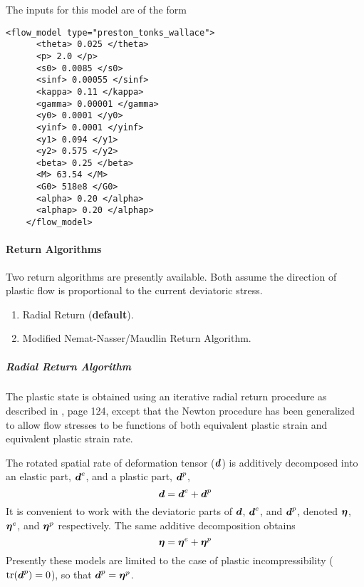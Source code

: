   The inputs for this model are of the form
  \begin{Verbatim}[fontsize=\footnotesize]
    <flow_model type="preston_tonks_wallace">
      <theta> 0.025 </theta>
      <p> 2.0 </p>
      <s0> 0.0085 </s0>
      <sinf> 0.00055 </sinf>
      <kappa> 0.11 </kappa>
      <gamma> 0.00001 </gamma>
      <y0> 0.0001 </y0>
      <yinf> 0.0001 </yinf>
      <y1> 0.094 </y1>
      <y2> 0.575 </y2>
      <beta> 0.25 </beta>
      <M> 63.54 </M>
      <G0> 518e8 </G0>
      <alpha> 0.20 </alpha>
      <alphap> 0.20 </alphap>
    </flow_model>
  \end{Verbatim}

\paragraph{Return Algorithms}

Two return algorithms are presently available.  Both assume the direction
of plastic flow is proportional to the current deviatoric stress.
  \begin{enumerate}
    \item Radial Return ({\bf default}).
    \item Modified Nemat-Nasser/Maudlin Return Algorithm.
  \end{enumerate}

\subparagraph{Radial Return Algorithm}
The plastic state is obtained using an iterative radial return
procedure as described in \cite{Simo98}, page 124, except that the
Newton procedure has been generalized to allow flow stresses to be
functions of both equivalent plastic strain and equivalent plastic
strain rate.

The rotated spatial rate of deformation tensor ($\Bd$) is additively
decomposed into an elastic part, $\Bd^e$, and a plastic part, $\Bd^p$,
  \begin{equation}
     \Bd = \Bd^e + \Bd^p
  \end{equation}
  It is convenient to work with the deviatoric parts of $\Bd$,
  $\Bd^e$, and $\Bd^p$, denoted $\Beta$, $\Beta^e$, and
  $\Beta^p$ respectively. The same additive decomposition obtains
  \begin{equation}
     \Beta = \Beta^e + \Beta^p
  \end{equation}
  Presently these models are limited to the case of plastic
  incompressibility ($\Tr{(\Bd^p)} = 0$), so that $\Bd^p=\Beta^p$.

